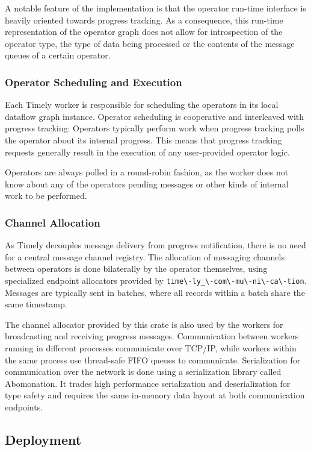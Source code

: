 \begin{addedbar}
A notable feature of the implementation is that the operator run-time interface
is heavily oriented towards progress tracking. 
As a consequence, this run-time representation of the operator graph does not
allow for introspection of the operator type, the type of data being processed
or the contents of the message queues of a certain operator.

\subsubsection{Operator Scheduling and Execution}

Each Timely worker is responsible for scheduling the operators in its local
dataflow graph instance. Operator scheduling is cooperative and interleaved 
with progress tracking: Operators typically perform work when progress tracking
polls the operator about its internal progress. This means that progress
tracking requests generally result in the execution of any user-provided
operator logic.

Operators are always polled in a round-robin fashion, as the worker does
not know about any of the operators pending messages or other kinds of
internal work to be performed.

\subsubsection{Channel Allocation}

As Timely decouples message delivery from progress notification, there is no
need for a central message channel registry. The allocation of messaging
channels between operators is done bilaterally by the operator themselves,
using specialized endpoint allocators provided by
\lstinline{time\-ly_\-com\-mu\-ni\-ca\-tion}. Messages are typically sent in
batches, where all records within a batch share the same timestamp.

The channel allocator provided by this crate is also used by the workers for
broadcasting and receiving progress messages. Communication between workers
running in different processes communicate over TCP/IP, while workers within
the same process use thread-safe FIFO queues to communicate.
Serialization for communication over the network is done using a serialization
library called Abomonation. It trades high performance serialization and 
deserialization for type safety and requires the same in-memory data layout
at both communication endpoints.

\subsection{Deployment}


\end{addedbar}
